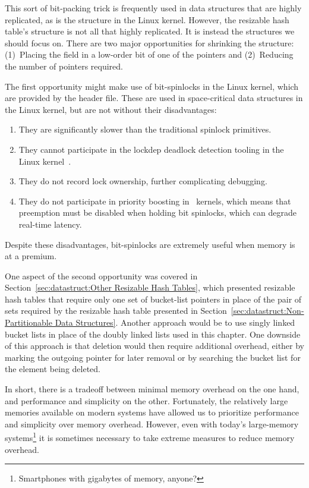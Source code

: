 This sort of bit-packing trick is frequently used in data structures
that are highly replicated, as is the  structure in the Linux
kernel.
However, the resizable hash table's  structure is not all that
highly replicated.
It is instead the  structures we should focus on.
There are two major opportunities for shrinking the  structure:
(1)~Placing the  field in a low-order bit of one of the
 pointers and (2)~Reducing the number of pointers required.

The first opportunity might make use of bit-spinlocks in the Linux
kernel, which are provided by the 
header file.
These are used in space-critical data structures in the Linux kernel,
but are not without their disadvantages:

\begin{enumerate}
\item	They are significantly slower than the traditional spinlock
	primitives.
\item	They cannot participate in the lockdep deadlock detection
	tooling in the Linux kernel~\cite{JonathanCorbet2006lockdep}.
\item	They do not record lock ownership, further complicating
	debugging.
\item	They do not participate in priority boosting in \rt\ kernels,
	which means that preemption must be disabled when holding
	bit spinlocks, which can degrade real-time latency.
\end{enumerate}

Despite these disadvantages, bit-spinlocks are extremely useful when
memory is at a premium.

One aspect of the second opportunity was covered in
Section~\ref{sec:datastruct:Other Resizable Hash Tables},
which presented resizable hash tables that require only one
set of bucket-list pointers in place of the pair of sets required
by the resizable hash table presented in
Section~\ref{sec:datastruct:Non-Partitionable Data Structures}.
Another approach would be to use singly linked bucket lists in
place of the doubly linked lists used in this chapter.
One downside of this approach is that deletion would then require
additional overhead, either by marking the outgoing pointer
for later removal
or by searching the bucket list for the element being deleted.

In short, there is a tradeoff between minimal memory overhead on
the one hand, and performance and simplicity on the other.
Fortunately, the relatively large memories available on modern
systems have allowed us to prioritize performance and simplicity
over memory overhead.
However, even with today's large-memory systems\footnote{
	Smartphones with gigabytes of memory, anyone?}
it is sometimes necessary to take extreme measures to reduce
memory overhead.

